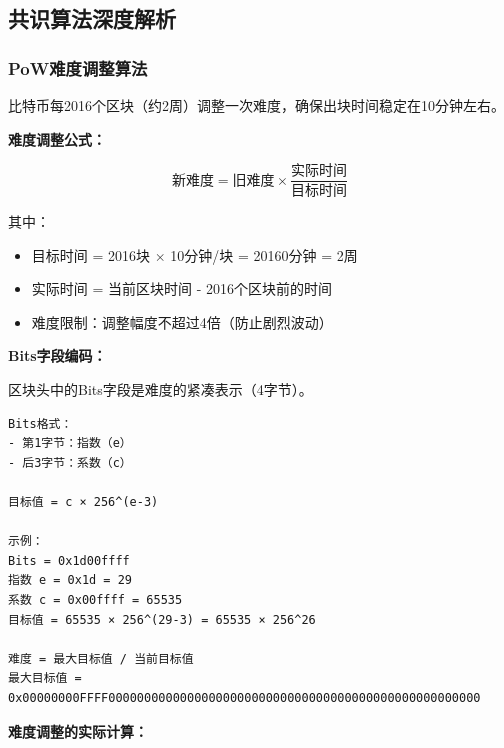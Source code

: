 ﻿\documentclass[12pt,a4paper]{article}
\begin{document}
\subsection{共识算法深度解析}

\subsubsection{PoW难度调整算法}

比特币每2016个区块（约2周）调整一次难度，确保出块时间稳定在10分钟左右。

\begin{theorybox}
\textbf{难度调整公式：}

$$\text{新难度} = \text{旧难度} \times \frac{\text{实际时间}}{\text{目标时间}}$$

其中：
\begin{itemize}[leftmargin=1.5em]
\item 目标时间 = 2016块 $\times$ 10分钟/块 = 20160分钟 = 2周
\item 实际时间 = 当前区块时间 - 2016个区块前的时间
\item 难度限制：调整幅度不超过4倍（防止剧烈波动）
\end{itemize}
\end{theorybox}

\textbf{Bits字段编码：}

区块头中的Bits字段是难度的紧凑表示（4字节）。

\begin{lstlisting}
Bits格式：
- 第1字节：指数（e）
- 后3字节：系数（c）

目标值 = c × 256^(e-3)

示例：
Bits = 0x1d00ffff
指数 e = 0x1d = 29
系数 c = 0x00ffff = 65535
目标值 = 65535 × 256^(29-3) = 65535 × 256^26

难度 = 最大目标值 / 当前目标值
最大目标值 = 0x00000000FFFF0000000000000000000000000000000000000000000000000000
\end{lstlisting}

\textbf{难度调整的实际计算：}
\end{document}
